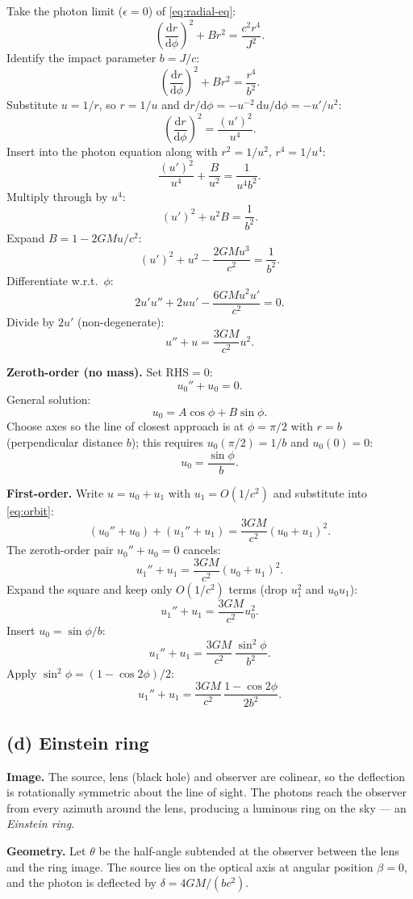\documentclass[11pt]{article}
\newcommand{\de}{\mathrm{d}}
\begin{document}
Take the photon limit ($\epsilon=0$) of \eqref{eq:radial-eq}:
\[ \left(\frac{\de r}{\de\phi}\right)^{\!2}+Br^2=\frac{c^2 r^4}{J^2}. \]
Identify the impact parameter $b=J/c$:
\[ \left(\frac{\de r}{\de\phi}\right)^{\!2}+Br^2=\frac{r^4}{b^2}. \]
Substitute $u=1/r$, so $r=1/u$ and $\de r/\de\phi=-u^{-2}\,\de u/\de\phi=-u'/u^2$:
\[ \left(\frac{\de r}{\de\phi}\right)^{\!2}=\frac{(u')^2}{u^4}. \]
Insert into the photon equation along with $r^2=1/u^2$, $r^4=1/u^4$:
\[ \frac{(u')^2}{u^4}+\frac{B}{u^2}=\frac{1}{u^4 b^2}. \]
Multiply through by $u^4$:
\[ (u')^2+u^2 B=\frac{1}{b^2}. \]
Expand $B=1-2GMu/c^2$:
\[ (u')^2+u^2-\frac{2GM u^3}{c^2}=\frac{1}{b^2}. \]
Differentiate w.r.t.\ $\phi$:
\[ 2u'u''+2u u'-\frac{6GM u^2 u'}{c^2}=0. \]
Divide by $2u'$ (non-degenerate):
\begin{equation}
\boxed{\;u''+u=\frac{3GM}{c^2}u^2.\;}
\label{eq:orbit}
\end{equation}

\textbf{Zeroth-order (no mass).} Set RHS$=0$:
\[ u_0''+u_0=0. \]
General solution:
\[ u_0=A\cos\phi+B\sin\phi. \]
Choose axes so the line of closest approach is at $\phi=\pi/2$ with $r=b$ (perpendicular distance $b$); this requires $u_0(\pi/2)=1/b$ and $u_0(0)=0$:
\[ u_0=\frac{\sin\phi}{b}. \]

\textbf{First-order.} Write $u=u_0+u_1$ with $u_1=O(1/c^2)$ and substitute into \eqref{eq:orbit}:
\[ (u_0''+u_0)+(u_1''+u_1)=\frac{3GM}{c^2}(u_0+u_1)^2. \]
The zeroth-order pair $u_0''+u_0=0$ cancels:
\[ u_1''+u_1=\frac{3GM}{c^2}(u_0+u_1)^2. \]
Expand the square and keep only $O(1/c^2)$ terms (drop $u_1^2$ and $u_0u_1$):
\[ u_1''+u_1=\frac{3GM}{c^2}u_0^2. \]
Insert $u_0=\sin\phi/b$:
\[ u_1''+u_1=\frac{3GM}{c^2}\,\frac{\sin^2\phi}{b^2}. \]
Apply $\sin^2\phi=(1-\cos 2\phi)/2$:
\begin{equation}
\boxed{\;u_1''+u_1=\frac{3GM}{c^2}\,\frac{1-\cos 2\phi}{2b^2}.\;}
\label{eq:u1-eq}
\end{equation}

\subsection*{(d) Einstein ring}

\textbf{Image.} The source, lens (black hole) and observer are colinear, so the deflection is rotationally symmetric about the line of sight. The photons reach the observer from every azimuth around the lens, producing a luminous ring on the sky --- an \emph{Einstein ring}.

\textbf{Geometry.} Let $\theta$ be the half-angle subtended at the observer between the lens and the ring image. The source lies on the optical axis at angular position $\beta=0$, and the photon is deflected by $\delta=4GM/(bc^2)$.
\end{document}
